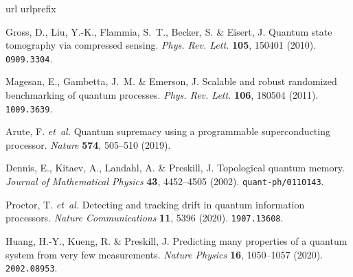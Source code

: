 \documentclass[aps,prresearch,reprint,superscriptaddress,nofootinbib,amsmath,amssymb]{revtex4-2}
\begin{document}
\begin{thebibliography}{10}
\expandafter\ifx\csname url\endcsname\relax
  \def\url#1{\texttt{#1}}\fi
\expandafter\ifx\csname urlprefix\endcsname\relax\def\urlprefix{URL }\fi
\providecommand{\bibinfo}[2]{#2}
\providecommand{\eprint}[2][]{\url{#2}}

\bibinfo{author}{Gross, D.}, \bibinfo{author}{Liu, Y.-K.},
  \bibinfo{author}{Flammia, S.~T.}, \bibinfo{author}{Becker, S.} \&
  \bibinfo{author}{Eisert, J.}
\newblock \bibinfo{title}{Quantum state tomography via compressed sensing}.
\newblock \emph{\bibinfo{journal}{Phys. Rev. Lett.}}
  \textbf{\bibinfo{volume}{105}}, \bibinfo{pages}{150401}
  (\bibinfo{year}{2010}).
\newblock \eprint{0909.3304}.

\bibinfo{author}{Magesan, E.}, \bibinfo{author}{Gambetta, J.~M.} \&
  \bibinfo{author}{Emerson, J.}
\newblock \bibinfo{title}{Scalable and robust randomized benchmarking of quantum
  processes}.
\newblock \emph{\bibinfo{journal}{Phys. Rev. Lett.}}
  \textbf{\bibinfo{volume}{106}}, \bibinfo{pages}{180504}
  (\bibinfo{year}{2011}).
\newblock \eprint{1009.3639}.

\bibinfo{author}{Arute, F.} \emph{et~al.}
\newblock \bibinfo{title}{Quantum supremacy using a programmable superconducting
  processor}.
\newblock \emph{\bibinfo{journal}{Nature}} \textbf{\bibinfo{volume}{574}},
  \bibinfo{pages}{505--510} (\bibinfo{year}{2019}).

\bibinfo{author}{Dennis, E.}, \bibinfo{author}{Kitaev, A.},
  \bibinfo{author}{Landahl, A.} \& \bibinfo{author}{Preskill, J.}
\newblock \bibinfo{title}{Topological quantum memory}.
\newblock \emph{\bibinfo{journal}{Journal of Mathematical Physics}}
  \textbf{\bibinfo{volume}{43}}, \bibinfo{pages}{4452--4505}
  (\bibinfo{year}{2002}).
\newblock \eprint{quant-ph/0110143}.

\bibinfo{author}{Proctor, T.} \emph{et~al.}
\newblock \bibinfo{title}{Detecting and tracking drift in quantum information
  processors}.
\newblock \emph{\bibinfo{journal}{Nature Communications}}
  \textbf{\bibinfo{volume}{11}}, \bibinfo{pages}{5396} (\bibinfo{year}{2020}).
\newblock \eprint{1907.13608}.

\bibinfo{author}{Huang, H.-Y.}, \bibinfo{author}{Kueng, R.} \&
  \bibinfo{author}{Preskill, J.}
\newblock \bibinfo{title}{Predicting many properties of a quantum system from
  very few measurements}.
\newblock \emph{\bibinfo{journal}{Nature Physics}}
  \textbf{\bibinfo{volume}{16}}, \bibinfo{pages}{1050--1057}
  (\bibinfo{year}{2020}).
\newblock \eprint{2002.08953}.


\end{thebibliography}
\end{document}
